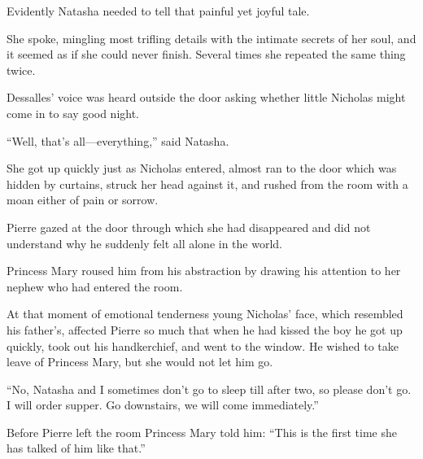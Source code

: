 Evidently Natasha needed to tell that painful yet joyful tale.

She spoke, mingling most trifling details with the intimate
secrets of her soul, and it seemed as if she could never
finish. Several times she repeated the same thing twice.

Dessalles' voice was heard outside the door asking whether little
Nicholas might come in to say good night.

``Well, that's all---everything,'' said Natasha.

She got up quickly just as Nicholas entered, almost ran to the
door which was hidden by curtains, struck her head against it,
and rushed from the room with a moan either of pain or sorrow.

Pierre gazed at the door through which she had disappeared and
did not understand why he suddenly felt all alone in the world.

Princess Mary roused him from his abstraction by drawing his
attention to her nephew who had entered the room.

At that moment of emotional tenderness young Nicholas' face,
which resembled his father's, affected Pierre so much that when
he had kissed the boy he got up quickly, took out his
handkerchief, and went to the window. He wished to take leave of
Princess Mary, but she would not let him go.

``No, Natasha and I sometimes don't go to sleep till after two,
so please don't go. I will order supper. Go downstairs, we will
come immediately.''

Before Pierre left the room Princess Mary told him: ``This is the
first time she has talked of him like that.''


